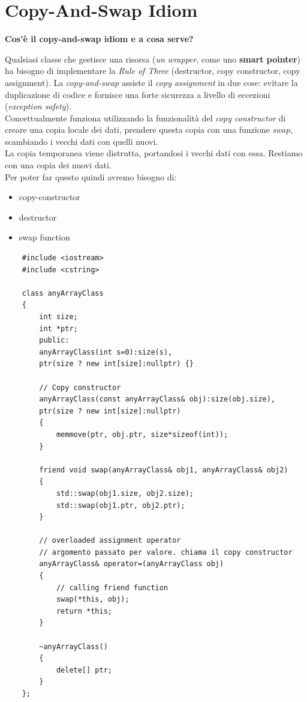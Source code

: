 
\section{Copy-And-Swap Idiom}

\textsf{\small \textbf{Cos'è il \textbf{copy-and-swap idiom} e a cosa serve?}} \break

\textsf{\small Qualsiasi classe che gestisce una risorsa (\emph{un wrapper}, come uno \textbf{smart pointer}) ha bisogno di implementare la \emph{Rule of Three} (destructor, copy constructor, copy assignment). La \emph{copy-and-swap} assiste il \emph{copy assignment} in due cose: evitare la duplicazione di codice e fornisce una forte sicurezza a livello di eccezioni (\emph{exception safety}).} \\

\textsf{\small Concettualmente funziona utilizzando la funzionalità del \emph{copy constructor} di creare una copia locale dei dati, prendere questa copia con una funzione \emph{swap}, scambiando i vecchi dati con quelli nuovi.} \\

\textsf{\small La copia temporanea viene distrutta, portandosi i vecchi dati con essa. Restiamo con una copia dei nuovi dati.} \\

\textsf{\small Per poter far questo quindi avremo bisogno di: } \\

\begin{itemize}
	\item \textsf{\small copy-constructor}
	\item \textsf{\small destructor}
	\item \textsf{\small swap function}
\end{itemize}

\begin{lstlisting}
	#include <iostream>
	#include <cstring>
	
	class anyArrayClass
	{
		int size;
		int *ptr;
		public:
		anyArrayClass(int s=0):size(s),
		ptr(size ? new int[size]:nullptr) {}
		
		// Copy constructor
		anyArrayClass(const anyArrayClass& obj):size(obj.size),
		ptr(size ? new int[size]:nullptr)
		{
			memmove(ptr, obj.ptr, size*sizeof(int));
		}
		
		friend void swap(anyArrayClass& obj1, anyArrayClass& obj2)
		{
			std::swap(obj1.size, obj2.size);
			std::swap(obj1.ptr, obj2.ptr);
		}
		
		// overloaded assignment operator
		// argomento passato per valore. chiama il copy constructor
		anyArrayClass& operator=(anyArrayClass obj)	
		{
			// calling friend function
			swap(*this, obj);
			return *this;
		}
		
		~anyArrayClass()
		{
			delete[] ptr;
		}
	};
\end{lstlisting}

